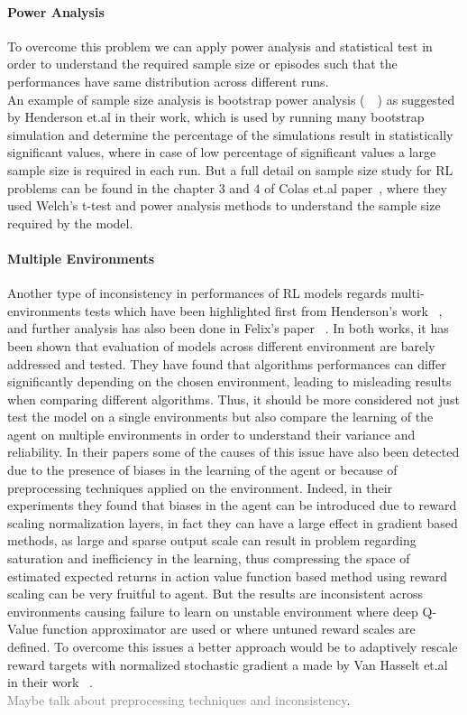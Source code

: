 \documentclass{article}
\begin{document}
\paragraph{Power Analysis}
To overcome this problem we can apply power analysis and statistical test in order to understand the required sample size or episodes such that the performances have same distribution across different runs.\\
An example of sample size analysis is bootstrap power analysis (~\cite{pwranaly1}~\cite{pwranaly2}) as suggested by Henderson et.al \cite{DRL01} in their work, which is used by running many bootstrap simulation and determine the percentage of the simulations result in statistically significant values, where in case of low percentage of significant values a large sample size is required in each run. But a full detail on sample size study for RL problems can be found in the chapter 3 and 4 of Colas et.al paper~\cite{PowerAnalysis}, where they used Welch's t-test and power analysis methods to understand the sample size required by the model.
\paragraph{Multiple Environments}
Another type of inconsistency in performances of RL models regards multi-environments tests which have been highlighted first from Henderson's work  ~\cite{DRL01}, and further analysis has also been done in Felix's paper ~\cite{BenchmarkingDRL}.  In both works, it has been shown that evaluation of models across different environment are barely addressed and tested. 
They have found that algorithms performances can differ significantly depending on the chosen environment, leading to misleading results when comparing different algorithms. Thus, it should be more considered not just test the model on a single environments but also compare the learning of the agent on multiple environments in order to understand their variance and reliability.
In their papers some of the causes of this issue have also been detected due to the presence of biases  in the learning of the agent or because of preprocessing techniques applied on the environment. Indeed, in their experiments they found that biases in the agent can be introduced due to reward scaling normalization layers, in fact they can have a large effect in gradient based methods, as large and sparse output scale can result in problem regarding saturation and inefficiency in the learning, thus compressing the space of estimated expected returns in action value function based method using reward scaling can be very fruitful to agent. But the results are inconsistent across environments causing failure to learn on unstable environment where deep Q-Value function approximator are used or where untuned reward scales are defined. To overcome this issues a better approach would be to adaptively rescale reward targets with normalized stochastic gradient a made by Van Hasselt et.al in their work ~\cite{VaHasselt}.\\
\textcolor{gray}{Maybe talk about preprocessing techniques and inconsistency}.\\
\end{document}
